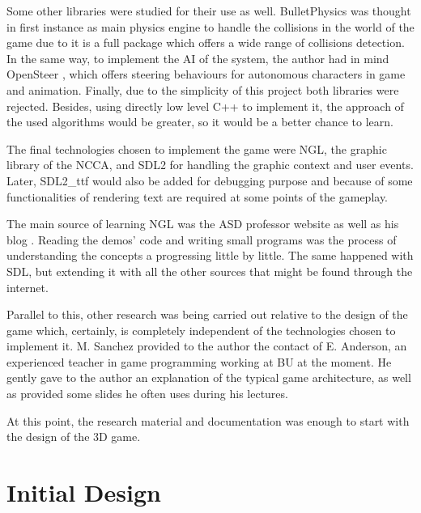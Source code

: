 \documentclass[]{article}
\begin{document}
 Some other libraries were studied for their use as well. BulletPhysics \cite{bulletPhysics} was thought in first instance as main physics engine to handle the collisions in the world of the game
 due to it is a full package which offers a wide range of collisions detection. In the same way, to implement the AI of the system, the author had in mind OpenSteer \cite{openSteer}, which offers
 steering behaviours for autonomous characters in game and animation. Finally, due to the simplicity of this project both libraries were rejected. Besides, using directly
 low level C++ to implement it, the approach of the used algorithms would be greater, so it would be a better chance to learn.
 
 The final technologies chosen to implement the game were NGL, the graphic library of the NCCA, and SDL2 for handling the graphic context and user events. Later, SDL2\_ttf would also be
 added for debugging purpose and because of some functionalities of rendering text are required at some points of the gameplay.
 
 The main source of learning NGL was the ASD professor website \cite{maceyWebsite} as well as his blog \cite{maceyBlog}. Reading the demos' code and writing small programs was the process of understanding the concepts a progressing 
 little by little. The same happened with SDL, but extending it with all the other sources that might be found through the internet.
 
 Parallel to this, other research was being carried out relative to the design of the game which, certainly, is completely independent of the technologies chosen to implement it. M. Sanchez provided
 to the author the contact of E. Anderson, an experienced teacher in game programming working at BU at the moment. He gently gave to the author an explanation of the typical game architecture, as well as provided 
 some slides he often uses during his lectures.
 
 At this point, the research material and documentation was enough to start with the design of the 3D game.

 

\section{Initial Design}
\end{document}
